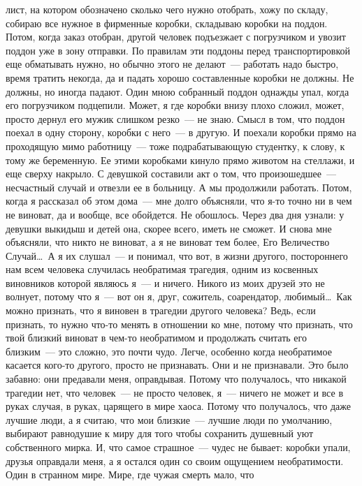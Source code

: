лист, на котором обозначено сколько чего нужно отобрать, хожу по складу, 
собираю все нужное в фирменные коробки, складываю коробки на поддон. Потом, когда заказ 
отобран, другой человек подъезжает с погрузчиком и увозит поддон уже в зону 
отправки. По правилам эти поддоны перед транспортировкой еще обматывать нужно, 
но обычно этого не делают~--- работать надо быстро, время тратить некогда, да и 
падать хорошо составленные коробки не должны. Не должны, но иногда падают. Один 
мною собранный поддон однажды упал, когда его погрузчиком подцепили. Может, я 
где коробки внизу плохо сложил, может, просто дернул его мужик слишком 
резко~--- не знаю. Смысл в том, что поддон поехал в одну сторону, коробки с него~--- в 
другую. И поехали коробки прямо на проходящую мимо работницу~--- тоже 
подрабатывающую студентку, к слову, к тому же беременную. Ее этими коробками 
кинуло прямо животом на стеллажи, и еще сверху накрыло. С девушкой составили 
акт о том, что произошедшее~--- несчастный случай и отвезли ее в больницу. А мы 
продолжили работать. Потом, когда я рассказал об этом дома~--- мне долго 
объясняли, что я-то точно ни в чем не виноват, да и вообще, все обойдется. Не 
обошлось. Через два дня узнали: у девушки выкидыш и детей она, скорее всего, 
иметь не сможет. И снова мне объясняли, что никто не виноват, а я не виноват 
тем более, Его Величество Случай\ldots\ А я их слушал~--- и понимал, что вот, в 
жизни другого, постороннего нам всем человека случилась необратимая трагедия, одним 
из косвенных виновников которой являюсь я~--- и ничего. Никого из моих друзей это 
не волнует, потому что я~--- вот он я, друг, сожитель, соарендатор, 
любимый\ldots\ Как можно признать, что я виновен в трагедии другого человека? Ведь, если признать, 
то нужно что-то менять в отношении ко мне, потому что признать, что твой 
близкий виноват в чем-то необратимом и продолжать считать его близким~--- это сложно, 
это почти чудо. Легче, особенно когда необратимое касается кого-то другого, просто 
не признавать. Они и не признавали. Это было забавно: они предавали меня, 
оправдывая. Потому что получалось, что никакой трагедии нет, что человек~--- не 
просто человек, я~--- ничего не может и все в руках случая, в руках, царящего в 
мире хаоса. Потому что получалось, что даже лучшие люди, а я считаю, что мои 
близкие~--- лучшие люди по умолчанию, выбирают равнодушие к миру для того чтобы 
сохранить душевный уют собственного мирка. И, что самое страшное~--- чудес не 
бывает: коробки упали, друзья оправдали меня, а я остался один со своим 
ощущением необратимости. Один в странном мире. Мире, где чужая смерть мало, что 
